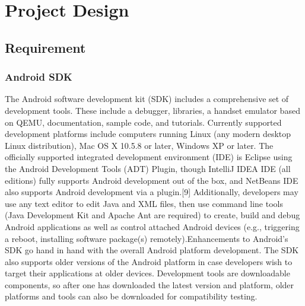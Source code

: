 \makeatletter
\def\@makechapterhead#1{%
  \vspace*{50\p@}%
  {\parindent \z@ \centering\normalfont
    \ifnum \c@secnumdepth >\m@ne
      \if@mainmatter
         \Large\bfseries \@chapapp\space \thechapter
        \par\nobreak
        \vskip 20\p@
      \fi
    \fi
    \interlinepenalty\@M
     \Large \bfseries #1\par\nobreak

    \vskip 40\p@
  }}
\def\@makeschapterhead#1{%
  \vspace*{50\p@}%
  {\parindent \z@ \centering
    \normalfont
    \interlinepenalty\@M
    \Large\bfseries  #1\par\nobreak
    \vskip 40\p@
  }}
\makeatother
\titlespacing*{\chapter}{0pt}{0pt}{12pt}

\chapter{Project Design}

\section{Requirement}

\subsection{Android SDK}

The Android software development kit (SDK) includes a comprehensive set of development tools. These include a debugger, libraries, a handset emulator based on QEMU, documentation, sample code, and tutorials. Currently supported development platforms include computers running Linux (any modern desktop Linux distribution), Mac OS X 10.5.8 or later, Windows XP or later. The officially supported integrated development environment (IDE) is Eclipse using the Android Development Tools (ADT) Plugin, though IntelliJ IDEA IDE (all editions) fully supports Android development out of the box, and NetBeans IDE also supports Android development via a plugin.[9] Additionally, developers may use any text editor to edit Java and XML files, then use command line tools (Java Development Kit and Apache Ant are required) to create, build and debug Android applications as well as control attached Android devices (e.g., triggering a reboot, installing software package(s) remotely).Enhancements to Android's SDK go hand in hand with the overall Android platform development. The SDK also supports older versions of the Android platform in case developers wish to target their applications at older devices. Development tools are downloadable components, so after one has downloaded the latest version and platform, older platforms and tools can also be downloaded for compatibility testing.

